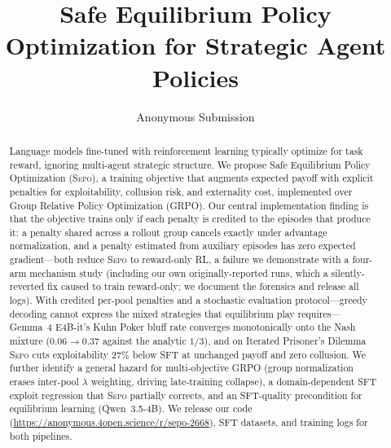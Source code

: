 \documentclass[letterpaper]{article} %
\title{Safe Equilibrium Policy Optimization for Strategic Agent Policies}
\author{Anonymous Submission}
\newcommand{\sepo}{\textsc{Sepo}}
\begin{document}
\maketitle
\begin{abstract}
Language models fine-tuned with reinforcement learning typically optimize for task reward, ignoring multi-agent strategic structure. We propose Safe Equilibrium Policy Optimization (\sepo{}), a training objective that augments expected payoff with explicit penalties for exploitability, collusion risk, and externality cost, implemented over Group Relative Policy Optimization (GRPO). Our central implementation finding is that the objective trains only if each penalty is credited to the episodes that produce it: a penalty shared across a rollout group cancels exactly under advantage normalization, and a penalty estimated from auxiliary episodes has zero expected gradient---both reduce \sepo{} to reward-only RL, a failure we demonstrate with a four-arm mechanism study (including our own originally-reported runs, which a silently-reverted fix caused to train reward-only; we document the forensics and release all logs). With credited per-pool penalties and a stochastic evaluation protocol---greedy decoding cannot express the mixed strategies that equilibrium play requires---Gemma~4 E4B-it's Kuhn Poker bluff rate converges monotonically onto the Nash mixture ($0.06 \to 0.37$ against the analytic $1/3$), and on Iterated Prisoner's Dilemma \sepo{} cuts exploitability 27\% below SFT at unchanged payoff and zero collusion. We further identify a general hazard for multi-objective GRPO (group normalization erases inter-pool $\lambda$ weighting, driving late-training collapse), a domain-dependent SFT exploit regression that \sepo{} partially corrects, and an SFT-quality precondition for equilibrium learning (Qwen~3.5-4B). We release our code (\url{https://anonymous.4open.science/r/sepo-2668}), SFT datasets, and training logs for both pipelines.
\end{abstract}
\end{document}
